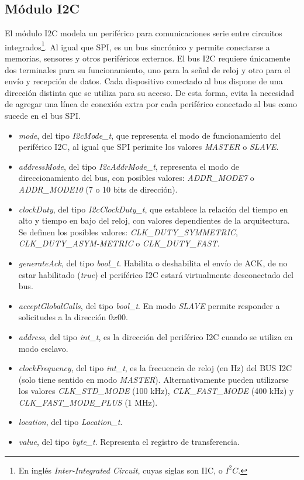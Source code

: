 \subsection{Módulo I2C}

El módulo I2C modela un periférico para comunicaciones serie entre circuitos integrados\footnote{En inglés \emph{Inter-Integrated Circuit}, cuyas siglas son IIC, o $I^{2}C$.}. Al igual que SPI, es un bus sincrónico y permite conectarse a memorias, sensores y otros periféricos externos. El bus I2C requiere únicamente dos terminales para su funcionamiento, uno para la señal de reloj y otro para el envío y recepción de datos. Cada dispositivo conectado al bus dispone de una dirección distinta que se utiliza para su acceso. De esta forma, evita la necesidad de agregar una línea de conexión extra por cada periférico conectado al bus como sucede en el bus SPI.


\begin{itemize}
\item
\emph{mode}, del tipo \emph{I2cMode\_t}, que representa el modo de funcionamiento del periférico I2C, al igual que SPI perimite los valores \emph{MASTER} o \emph{SLAVE}.
\item
\emph{addressMode}, del tipo \emph{I2cAddrMode\_t}, representa el modo de direccionamiento del bus, con posibles valores: \emph{ADDR\_MODE7} o \emph{ADDR\_MODE10} (7 o 10 bits de dirección).
\item
\emph{clockDuty}, del tipo \emph{I2cClockDuty\_t}, que establece la relación del tiempo en alto y tiempo en bajo del reloj, con valores dependientes de la arquitectura. Se definen los posibles valores: \emph{CLK\_DUTY\_SYMMETRIC}, \emph{CLK\_DUTY\_ASYM-METRIC} o \emph{CLK\_DUTY\_FAST}.
\item
\emph{generateAck}, del tipo \emph{bool\_t}. Habilita o deshabilita el envío de ACK, de no estar habilitado (\emph{true}) el periférico I2C estará virtualmente desconectado del bus.
\item
\emph{acceptGlobalCalls}, del tipo \emph{bool\_t}. En modo \emph{SLAVE} permite responder a solicitudes a la dirección $0x00$.
\item
\emph{address}, del tipo \emph{int\_t}, es la dirección del periférico I2C cuando se utiliza en modo esclavo.
\item
\emph{clockFrequency}, del tipo \emph{int\_t}, es la frecuencia de reloj (en Hz) del BUS I2C (solo tiene sentido en modo \emph{MASTER}). Alternativamente pueden utilizarse los valores \emph{CLK\_STD\_MODE} (100 kHz), \emph{CLK\_FAST\_MODE} (400 kHz) y \emph{CLK\_FAST\_MODE\_PLUS} (1 MHz).
\item
\emph{location}, del tipo \emph{Location\_t}.
\item
\emph{value}, del tipo \emph{byte\_t}. Representa el registro de transferencia.
\end{itemize}


